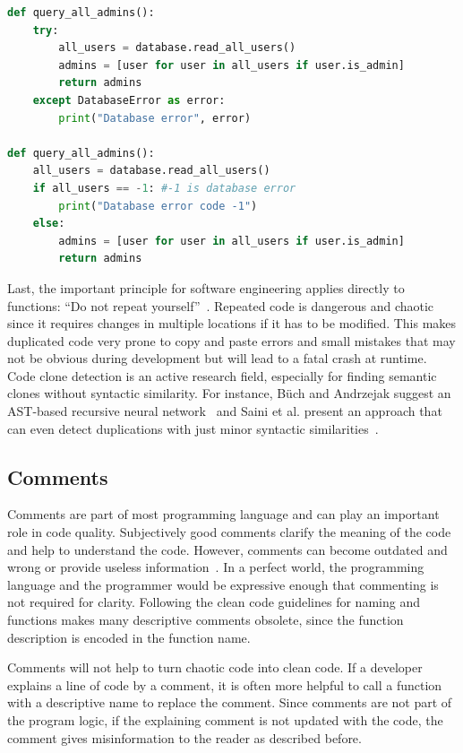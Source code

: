 \begin{lstlisting}[float=t , language=Python, label=lst:error_catching, caption={Sample listing for error handling with try and except statements vs error codes.}]
def query_all_admins():
    try:
        all_users = database.read_all_users()
        admins = [user for user in all_users if user.is_admin]
        return admins
    except DatabaseError as error:
        print("Database error", error)

def query_all_admins():
    all_users = database.read_all_users()
    if all_users == -1: #-1 is database error
        print("Database error code -1")
    else:
        admins = [user for user in all_users if user.is_admin]
        return admins
\end{lstlisting}


Last, the important principle for software engineering applies directly to functions: \enquote{Do not repeat yourself}~\cite{haoyu_basic_2012}. Repeated code is dangerous and chaotic since it requires changes in multiple locations if it has to be modified. This makes duplicated code very prone to copy and paste errors and small mistakes that may not be obvious during development but will lead to a fatal crash at runtime. Code clone detection is an active research field, especially for finding semantic clones without syntactic similarity. For instance, Büch and Andrzejak suggest an AST-based recursive neural network~\cite{buch_learning-based_2019} and Saini et al. present an approach that can even detect duplications with just minor syntactic similarities~\cite{saini_oreo_2018}.

\subsection{Comments}
Comments are part of most programming language and can play an important role in code quality. Subjectively good comments clarify the meaning of the code and help to understand the code. However, comments can become outdated and wrong or provide useless information~\cite{martin_clean_2009}. In a perfect world, the programming language and the programmer would be expressive enough that commenting is not required for clarity. Following the clean code guidelines for naming and functions makes many descriptive comments obsolete, since the function description is encoded in the function name.

Comments will not help to turn chaotic code into clean code. If a developer explains a line of code by a comment, it is often more helpful to call a function with a descriptive name to replace the comment. Since comments are not part of the program logic, if the explaining comment is not updated with the code, the comment gives misinformation to the reader as described before.

